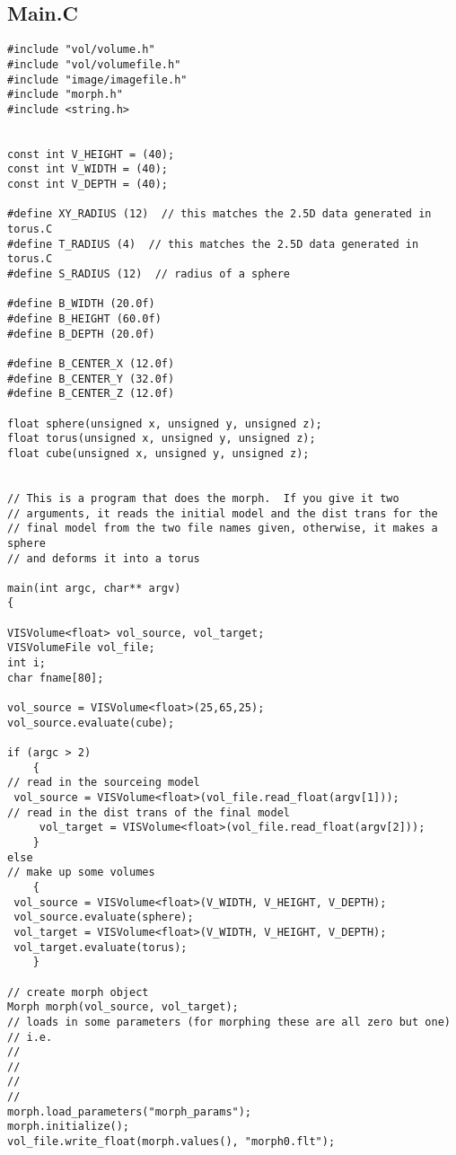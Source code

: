 \subsection{Main.C}
\begin{tt}
\begin{verbatim}
#include "vol/volume.h"
#include "vol/volumefile.h"
#include "image/imagefile.h"
#include "morph.h"
#include <string.h>


const int V_HEIGHT = (40);
const int V_WIDTH = (40);
const int V_DEPTH = (40);

#define XY_RADIUS (12)  // this matches the 2.5D data generated in
torus.C
#define T_RADIUS (4)  // this matches the 2.5D data generated in torus.C
#define S_RADIUS (12)  // radius of a sphere

#define B_WIDTH (20.0f)
#define B_HEIGHT (60.0f)
#define B_DEPTH (20.0f)

#define B_CENTER_X (12.0f)
#define B_CENTER_Y (32.0f)
#define B_CENTER_Z (12.0f)

float sphere(unsigned x, unsigned y, unsigned z);
float torus(unsigned x, unsigned y, unsigned z);
float cube(unsigned x, unsigned y, unsigned z);


// This is a program that does the morph.  If you give it two
// arguments, it reads the initial model and the dist trans for the
// final model from the two file names given, otherwise, it makes a
sphere
// and deforms it into a torus

main(int argc, char** argv)
{

VISVolume<float> vol_source, vol_target;
VISVolumeFile vol_file;
int i;
char fname[80];

vol_source = VISVolume<float>(25,65,25);
vol_source.evaluate(cube);

if (argc > 2)
    {
// read in the sourceing model
 vol_source = VISVolume<float>(vol_file.read_float(argv[1]));
// read in the dist trans of the final model
     vol_target = VISVolume<float>(vol_file.read_float(argv[2]));
    }
else
// make up some volumes
    {
 vol_source = VISVolume<float>(V_WIDTH, V_HEIGHT, V_DEPTH);
 vol_source.evaluate(sphere);
 vol_target = VISVolume<float>(V_WIDTH, V_HEIGHT, V_DEPTH);
 vol_target.evaluate(torus);
    }

// create morph object
Morph morph(vol_source, vol_target);
// loads in some parameters (for morphing these are all zero but one)
// i.e.
//
//
//
//
morph.load_parameters("morph_params");
morph.initialize();
vol_file.write_float(morph.values(), "morph0.flt");


\end{verbatim}
\end{tt}
